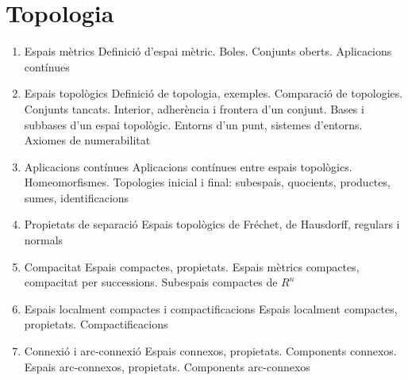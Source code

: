 \documentclass{article}
\begin{document}
\section{Topologia}
\begin{enumerate}
\item Espais mètrics
	\subitem Definició d’espai mètric. Boles. Conjunts oberts. Aplicacions contínues
\item Espais topològics
	\subitem Definició de topologia, exemples. Comparació de topologies. Conjunts tancats. Interior, adherència i frontera d’un conjunt. Bases i subbases d’un espai topològic. Entorns d’un punt, sistemes d’entorns. Axiomes de numerabilitat
\item Aplicacions contínues
	\subitem Aplicacions contínues entre espais topològics. Homeomorfismes. Topologies inicial i final: subespais, quocients, productes, sumes, identificacions
\item Propietats de separació
	\subitem Espais topològics de Fréchet, de Hausdorff, regulars i normals
\item Compacitat
	\subitem Espais compactes, propietats. Espais mètrics compactes, compacitat per successions. Subespais compactes de $R^n$
\item Espais localment compactes i compactificacions
	\subitem Espais localment compactes, propietats. Compactificacions
\item Connexió i arc-connexió
	\subitem Espais connexos, propietats. Components connexos. Espais arc-connexos, propietats. Components arc-connexos
\end{enumerate}
\end{document}
